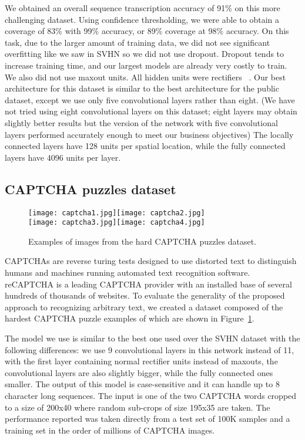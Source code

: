 \documentclass{article} \usepackage{comment}
\begin{document}
We obtained an overall sequence transcription accuracy of 91\% on this more challenging dataset.
Using confidence thresholding, we were able to obtain a coverage of 83\% with 99\% accuracy, or
89\% coverage at 98\% accuracy. On this task, due to the larger amount of training data, we did
not see significant overfitting like we saw in SVHN so we did not use dropout. Dropout tends to
increase training time, and our largest models are already very costly to train. We also did not use maxout units. All hidden units were rectifiers
~\citep{Jarrett-ICCV2009,Glorot+al-AI-2011}.
Our best architecture for this dataset is similar to the best architecture for the public dataset,
except we use only five convolutional layers rather than eight. (We have not tried using eight convolutional
layers on this dataset; eight layers may obtain slightly better results but the version of the network with five convolutional layers
performed accurately enough to meet our business objectives) The locally connected layers have
128 units per spatial location, while the fully connected layers have 4096 units per layer.

\subsection{CAPTCHA puzzles dataset}
\label{subsec:captchas}

\begin{figure}
\begin{centering}
\texttt{[image: captcha1.jpg]}\texttt{[image: captcha2.jpg]}\\
\texttt{[image: captcha3.jpg]}\texttt{[image: captcha4.jpg]}
\caption{Examples of images from the hard CAPTCHA puzzles dataset.}
\label{fig:captcha}
\end{centering}
\end{figure}

CAPTCHAs are reverse turing tests designed to use distorted text to distinguish humans and machines running automated text recognition software. reCAPTCHA is a leading CAPTCHA provider with an installed base of several hundreds of thousands of websites. To evaluate the generality of the proposed approach to recognizing arbitrary text, we created a dataset composed of the  hardest CAPTCHA puzzle examples of which are shown in Figure~\ref{fig:captcha}. 

The model we use is similar to the best one used over the SVHN dataset with the following differences: we use 9 convolutional layers in this network instead of 11, with the first layer containing normal rectifier units instead of maxouts, the convolutional layers are also slightly bigger, while the fully connected ones smaller. The output of this model is case-sensitive and it can handle up to 8 character long sequences. The input is one of the two CAPTCHA words cropped to a size of 200x40 where random sub-crops of size 195x35 are taken. The performance reported was taken directly from a test set of 100K samples and a training set in the order of millions of CAPTCHA images.
\end{document}
